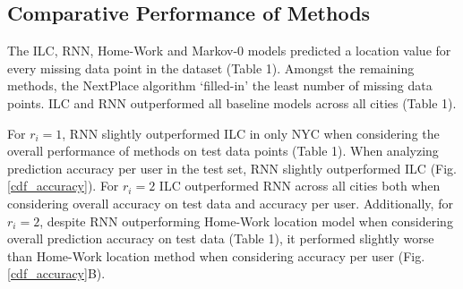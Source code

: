

\subsection{Comparative Performance of Methods}
The ILC, RNN, Home-Work and Markov-0 models predicted a location value for every missing data point in the dataset (Table 1). %
Amongst the remaining methods, the NextPlace algorithm `filled-in' the least number of missing data points. ILC and RNN outperformed all baseline models across all cities (Table 1). 

For $r_i=1$, RNN slightly outperformed ILC in only NYC when considering the overall performance of methods on test data points (Table 1). When analyzing prediction accuracy per user in the test set, RNN slightly outperformed ILC (Fig. \ref{cdf_accuracy}). For $r_i=2$ ILC outperformed RNN across all cities both when considering overall accuracy on test data and accuracy per user. Additionally, for $r_i=2$, despite RNN outperforming Home-Work location model when considering overall prediction accuracy on test data (Table 1), it performed slightly worse than Home-Work location method when considering accuracy per user (Fig. \ref{cdf_accuracy}B). 

